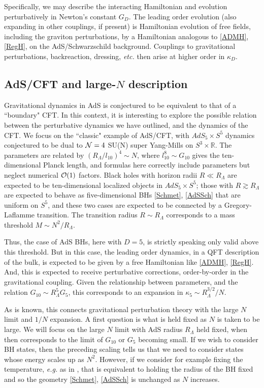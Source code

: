 \documentclass[12pt]{article}
\numberwithin{equation}{section}
\newcommand{\calo}{{\cal O}}
\begin{document}
Specifically, we may describe the interacting Hamiltonian and evolution perturbatively in Newton's constant $G_D$.  The leading order evolution (also expanding in other couplings, if present) is Hamiltonian evolution of free fields, including the graviton perturbations, by a Hamiltonian analogous to \eqref{ADMH},  \eqref{RegH}, on the AdS/Schwarzschild background.  Couplings to gravitational perturbations, backreaction, dressing, {\it etc.} then arise at higher order in $\kappa_D$.

\subsection{AdS/CFT and large-$N$ description}

Gravitational dynamics in AdS is conjectured to be equivalent to that of a ``boundary"  CFT\cite{Mald}.  In this context, it is interesting to explore the possible relation between the perturbative dynamics we have outlined, and the dynamics of the CFT.  We focus on the ``classic" example of AdS/CFT, with $AdS_5\times S^5$ dynamics conjectured to be dual to ${\cal N}=4$ SU(N) super Yang-Mills on $S^3\times \mathbb{R}$.  The parameters are related by $(R_\Lambda/l_{10})^4 \sim  N$, where  $l_{10}^8 \sim G_{10}$ gives the ten-dimensional Planck length, and formulas here correctly include parameters but neglect numerical $\calo(1)$ factors.  Black holes with horizon radii $R\ll R_\Lambda$ are expected to be ten-dimensional localized objects in $AdS_5\times S^5$; those with $R\gtrsim R_\Lambda$ are expected to behave as five-dimensional BHs \eqref{Schmet}, \eqref{AdSSch} that are uniform on $S^5$, and these two cases are expected to be connected by a Gregory-Laflamme transition\cite{GrLa}.  The transition radius $R\sim R_\Lambda$ corresponds to a mass threshold $M\sim N^2/R_\Lambda$.  

Thus, the case of AdS BHs, here with $D=5$, is strictly speaking only valid above this threshold.  But in this case, the leading order dynamics, in a QFT description of the bulk, is expected to be given by a free Hamiltonian like \eqref{ADMH},  \eqref{RegH}.  And, this is expected to receive perturbative corrections, order-by-order in the gravitational coupling.  Given the relationship between parameters, and the relation $G_{10}\sim R_\Lambda^5 G_5$, this corresponds to an expansion in $\kappa_5\sim R^{3/2}_\Lambda/N$.  

As is known, this connects gravitational perturbation theory with the large $N$ limit and $1/N$ expansion.  A first question is what is held fixed as $N$ is taken to be large.  We will focus on the large $N$ limit with AdS radius $R_\Lambda$ held fixed, when then corresponds to the limit of $G_{10}$ or $G_5$ becoming small.  If we wish to consider BH states, then the preceding scaling tells us that we need to consider states whose energy scales up as $N^2$.  However, if we consider for example fixing the temperature, {\it e.g.} as in \cite{ScWi}, that is equivalent to holding the radius of the BH fixed and so the geometry  \eqref{Schmet}, \eqref{AdSSch} is unchanged as $N$ increases.
\end{document}
